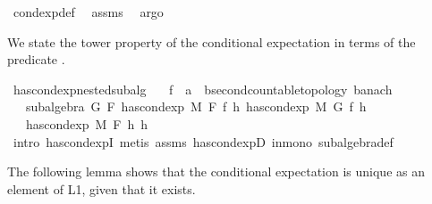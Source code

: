 \begin{isabellebody}
%
\isatagproof
{}\isamarkupfalse%
\ cond{\isacharunderscore}{\kern0pt}exp{\isacharunderscore}{\kern0pt}def\ \isamarkupfalse%
\ assms\ \isamarkupfalse%
\ argo%
\endisatagproof
{\isafoldproof}%
%
\isadelimproof
%
\endisadelimproof
%
\begin{isamarkuptext}%
We state the tower property of the conditional expectation in terms of the predicate .%
\end{isamarkuptext}\isamarkuptrue%
\isamarkupfalse%
\ has{\isacharunderscore}{\kern0pt}cond{\isacharunderscore}{\kern0pt}exp{\isacharunderscore}{\kern0pt}nested{\isacharunderscore}{\kern0pt}subalg{\isacharcolon}{\kern0pt}\isanewline
\ \ \ f\ {\isacharcolon}{\kern0pt}{\isacharcolon}{\kern0pt}\ {\isachardoublequoteopen}{\isacharprime}{\kern0pt}a\ {\isasymRightarrow}\ {\isacharprime}{\kern0pt}b{\isacharcolon}{\kern0pt}{\isacharcolon}{\kern0pt}{\isacharbraceleft}{\kern0pt}second{\isacharunderscore}{\kern0pt}countable{\isacharunderscore}{\kern0pt}topology{\isacharcomma}{\kern0pt}\ banach{\isacharbraceright}{\kern0pt}{\isachardoublequoteclose}\isanewline
\ \ \ {\isachardoublequoteopen}subalgebra\ G\ F{\isachardoublequoteclose}\ {\isachardoublequoteopen}has{\isacharunderscore}{\kern0pt}cond{\isacharunderscore}{\kern0pt}exp\ M\ F\ f\ h{\isachardoublequoteclose}\ {\isachardoublequoteopen}has{\isacharunderscore}{\kern0pt}cond{\isacharunderscore}{\kern0pt}exp\ M\ G\ f\ h{\isacharprime}{\kern0pt}{\isachardoublequoteclose}\isanewline
\ \ \ {\isachardoublequoteopen}has{\isacharunderscore}{\kern0pt}cond{\isacharunderscore}{\kern0pt}exp\ M\ F\ h{\isacharprime}{\kern0pt}\ h{\isachardoublequoteclose}\isanewline
%
\isadelimproof
\ \ %
\endisadelimproof
%
\isatagproof
{}\isamarkupfalse%
\ {\isacharparenleft}{\kern0pt}intro\ has{\isacharunderscore}{\kern0pt}cond{\isacharunderscore}{\kern0pt}expI{\isacharprime}{\kern0pt}{\isacharparenright}{\kern0pt}\ {\isacharparenleft}{\kern0pt}metis\ assms\ has{\isacharunderscore}{\kern0pt}cond{\isacharunderscore}{\kern0pt}expD\ in{\isacharunderscore}{\kern0pt}mono\ subalgebra{\isacharunderscore}{\kern0pt}def{\isacharparenright}{\kern0pt}{\isacharplus}{\kern0pt}%
\endisatagproof
{\isafoldproof}%
%
\isadelimproof
%
\endisadelimproof
%
\begin{isamarkuptext}%
The following lemma shows that the conditional expectation is unique as an element of L1, given that it exists.%
\end{isamarkuptext}\isamarkuptrue%

\end{isabellebody}

